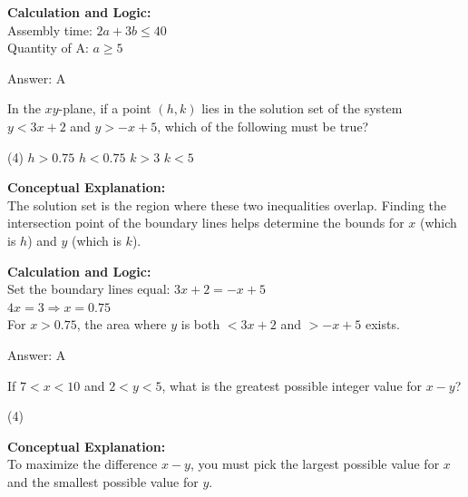 \documentclass[11pt,paper=a4,answers]{exam}
\begin{document}
\begin{questions}
\begin{solution}
\vspace{10pt}
\textbf{Calculation and Logic:} \\
Assembly time: $2a + 3b \le 40$ \\
Quantity of A: $a \ge 5$

\vspace{15pt}
Answer: \colorbox{yellow!100}{A}
\end{solution}

\vspace{20pt}

\question
In the $xy$-plane, if a point $(h, k)$ lies in the solution set of the system $y < 3x + 2$ and $y > -x + 5$, which of the following must be true?
\begin{tasks}(4)
    \task $h > 0.75$
    \task $h < 0.75$
    \task $k > 3$
    \task $k < 5$
\end{tasks}

\begin{solution}
\textbf{Conceptual Explanation:} \\
The solution set is the region where these two inequalities overlap. Finding the intersection point of the boundary lines helps determine the bounds for $x$ (which is $h$) and $y$ (which is $k$).

\vspace{10pt}
\textbf{Calculation and Logic:} \\
Set the boundary lines equal: $3x + 2 = -x + 5$ \\
$4x = 3 \Rightarrow x = 0.75$ \\
For $x > 0.75$, the area where $y$ is both $< 3x+2$ and $> -x+5$ exists.

\vspace{15pt}
Answer: \colorbox{yellow!100}{A}
\end{solution}

\vspace{20pt}

\question
If $7 < x < 10$ and $2 < y < 5$, what is the greatest possible integer value for $x - y$?
\begin{tasks}(4)
\end{tasks}

\begin{solution}
\textbf{Conceptual Explanation:} \\
To maximize the difference $x - y$, you must pick the largest possible value for $x$ and the smallest possible value for $y$.


\end{solution}
\end{questions}
\end{document}
